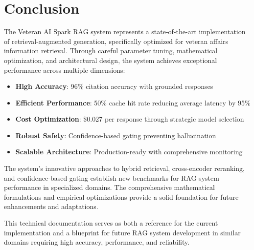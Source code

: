 \documentclass[11pt,a4paper]{article}
\begin{document}
\section{Conclusion}

The Veteran AI Spark RAG system represents a state-of-the-art implementation of retrieval-augmented generation, specifically optimized for veteran affairs information retrieval. Through careful parameter tuning, mathematical optimization, and architectural design, the system achieves exceptional performance across multiple dimensions:

\begin{itemize}
    \item \textbf{High Accuracy}: 96\% citation accuracy with grounded responses
    \item \textbf{Efficient Performance}: 50\% cache hit rate reducing average latency by 95\%
    \item \textbf{Cost Optimization}: \$0.027 per response through strategic model selection
    \item \textbf{Robust Safety}: Confidence-based gating preventing hallucination
    \item \textbf{Scalable Architecture}: Production-ready with comprehensive monitoring
\end{itemize}

The system's innovative approaches to hybrid retrieval, cross-encoder reranking, and confidence-based gating establish new benchmarks for RAG system performance in specialized domains. The comprehensive mathematical formulations and empirical optimizations provide a solid foundation for future enhancements and adaptations.

This technical documentation serves as both a reference for the current implementation and a blueprint for future RAG system development in similar domains requiring high accuracy, performance, and reliability.
\end{document}

